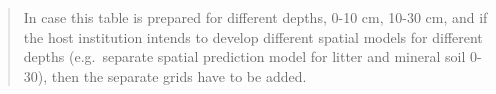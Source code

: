 \documentclass[]{book}
\theoremstyle{definition}
\theoremstyle{definition}
\theoremstyle{definition}
\theoremstyle{remark}
\begin{document}
\begin{quote}
In case this table is prepared for different depths, 0-10 cm, 10-30 cm,
and if the host institution intends to develop different spatial models
for different depths (e.g.~separate spatial prediction model for litter
and mineral soil 0-30), then the separate grids have to be added.
\end{quote}
\end{document}
